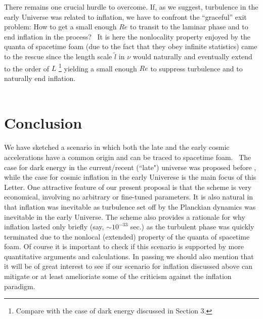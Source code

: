 \documentclass[12pt]{article}
\begin{document}
There remains one crucial hurdle to overcome. If, as we suggest, turbulence
in the early Universe was related to inflation, we have to confront
the “graceful” exit problem: How to get a small enough
$Re$ to transit to the laminar phase and to end inflation in 
the process?  It is here the nonlocality property enjoyed by 
the quanta of spacetime foam 
(due to the fact that they obey infinite statistics) came to the rescue since 
the length scale $\tilde{l}$ in $\nu$ would naturally and eventually extend to the order
of $L$ \footnote{Compare with the case of dark energy discussed in Section 3.}
yielding a small enough $Re$ to suppress turbulence and to 
naturally end inflation.\\

 
\section{Conclusion}

We have sketched a scenario in which both the late and the early cosmic
accelerations have a common origin and can be traced to spacetime foam. 
The case for dark energy in the current/recent (``late") universe was proposed before 
\cite{Arzano,plb},  while the case for cosmic inflation in the early Univerese is the 
main 
focus of this Letter.  One attractive feature of our present proposal is that the scheme is 
very economical, involving no arbitrary or fine-tuned parameters.  It is also natural in that 
inflation was inevitable as turbulence set off by the Planckian dynamics was inevitable in the 
early Universe.   The scheme also 
provides a rationale for why inflation lasted only briefly (say, $ \sim 10^{-33}$ sec.) as 
the turbulent phase was quickly terminated due to the nonlocal (extended) property of 
the quanta of spacetime foam. Of course it is important
to check if this scenario is supported by more quantitative arguments and 
calculations.  In passing we should also mention that
it will be of great interest to see if our scenario for inflation 
discussed above can mitigate or at least amelioriate some of the criticism 
\cite{PenStein} against the inflation paradigm.\\
\end{document}
